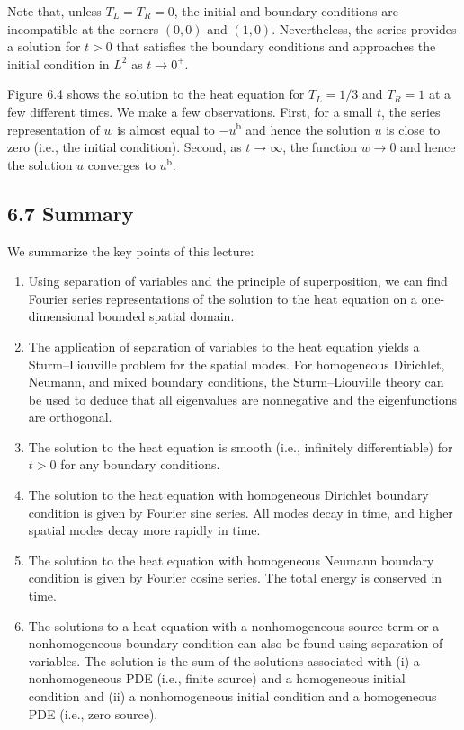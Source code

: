 \begin{example}

    Note that, unless $T_L = T_R = 0$, the initial and boundary conditions are incompatible at the corners $(0, 0)$ and $(1, 0)$. Nevertheless, the series provides a solution for $t > 0$ that satisfies the boundary conditions and approaches the initial condition in $L^2$ as $t \to 0^+$.

    Figure 6.4 shows the solution to the heat equation for $T_L = 1/3$ and $T_R = 1$ at a few different times. We make a few observations. First, for a small $t$, the series representation of $w$ is almost equal to $-u^{\mathrm{b}}$ and hence the solution $u$ is close to zero (i.e., the initial condition). Second, as $t \to \infty$, the function $w \to 0$ and hence the solution $u$ converges to $u^{\mathrm{b}}$.
\end{example}

\subsection{6.7 Summary}
We summarize the key points of this lecture:
\begin{enumerate}
    \item Using separation of variables and the principle of superposition, we can find Fourier series representations of the solution to the heat equation on a one-dimensional bounded spatial domain.
    \item The application of separation of variables to the heat equation yields a Sturm--Liouville problem for the spatial modes. For homogeneous Dirichlet, Neumann, and mixed boundary conditions, the Sturm--Liouville theory can be used to deduce that all eigenvalues are nonnegative and the eigenfunctions are orthogonal.
    \item The solution to the heat equation is smooth (i.e., infinitely differentiable) for $t > 0$ for any boundary conditions.
    \item The solution to the heat equation with homogeneous Dirichlet boundary condition is given by Fourier sine series. All modes decay in time, and higher spatial modes decay more rapidly in time.
    \item The solution to the heat equation with homogeneous Neumann boundary condition is given by Fourier cosine series. The total energy is conserved in time.
    \item The solutions to a heat equation with a nonhomogeneous source term or a nonhomogeneous boundary condition can also be found using separation of variables. The solution is the sum of the solutions associated with (i) a nonhomogeneous PDE (i.e., finite source) and a homogeneous initial condition and (ii) a nonhomogeneous initial condition and a homogeneous PDE (i.e., zero source).
\end{enumerate}
